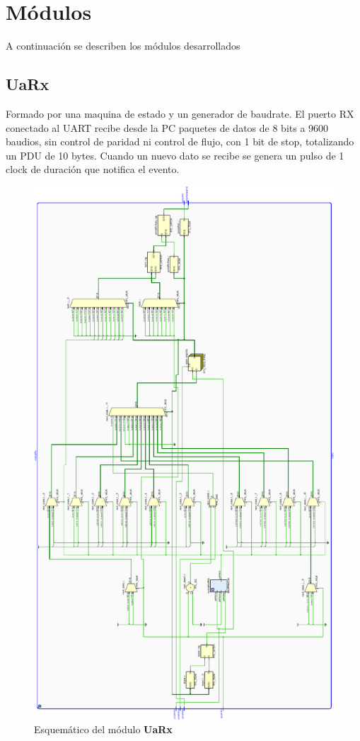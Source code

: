 \documentclass[12pt]{article}
\begin{document}
\section{Módulos}
A continuación se describen los módulos desarrollados
\subsection{UaRx}
Formado por una maquina de estado y un generador de baudrate. El puerto RX conectado al UART recibe desde la PC paquetes de datos de 8 bits a 9600 baudios, sin control de paridad ni control de flujo, con 1 bit de stop, totalizando un PDU de 10 bytes. Cuando un nuevo dato se recibe se genera un pulso de 1 clock de duración que notifica el evento.

\begin{figure}[H]
    \centering
    \includegraphics[angle=270, width=\textwidth]{uart-rx-crop}
    \caption{Esquemático del módulo \textbf{UaRx}}
\end{figure}
\end{document}
